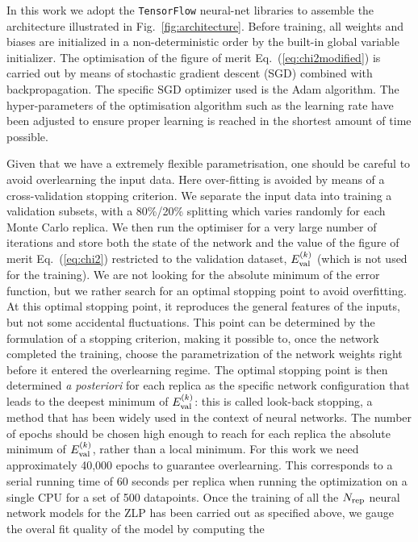 In this work we adopt the {\tt TensorFlow} neural-net libraries to assemble
the architecture illustrated in  Fig.~\ref{fig:architecture}.
%
Before training, all weights and biases are initialized in a non-deterministic order
by the built-in global variable initializer. 
%
The optimisation of the figure of merit Eq.~(\ref{eq:chi2modified}) is carried
out by means of stochastic gradient descent (SGD) combined with backpropagation. The
specific SGD optimizer used is the Adam algorithm.
%
The hyper-parameters of the optimisation algorithm such as the learning rate
have been adjusted to ensure proper learning is reached in the shortest amount
of time possible.
%

Given that we have a extremely flexible parametrisation, one should be careful
to avoid overlearning the input data.
%
Here over-fitting is avoided by means of a cross-validation stopping criterion.
%
We separate the input data into training a validation subsets, with a 80\%/20\% splitting
which varies randomly for each Monte Carlo replica.
%
We then run the optimiser for a very large number of iterations and store both
the state of the network and the value
of the figure of merit Eq.~(\ref{eq:chi2}) restricted to the validation
dataset, $E^{(k)}_{\rm val}$ (which is not used for the training).
%
We are not looking for the absolute minimum of the error function, 
but we rather search for an optimal stopping point to avoid overfitting. 
%
At this optimal stopping point, it reproduces the general features of the inputs, 
but not some accidental fluctuations. 
%
This point can be determined by the formulation of a stopping criterion, 
making it possible to, once the network completed the training, 
choose the parametrization of the network weights right before it 
entered the overlearning regime. 
%
The optimal stopping point is then determined {\it a posteriori} for each replica
as the specific network configuration that leads to the deepest minimum of $E^{(k)}_{\rm val}$:
this is called look-back stopping, a method that has been widely used in the context
of neural networks.
%
The number of epochs should be chosen high enough to reach for each replica 
the absolute minimum of $E^{(k)}_{\rm val}$, 
rather than a local minimum.
For this work we need approximately 40,000 epochs to guarantee overlearning.
%
This corresponds to a serial running time of 60 seconds per replica when running the optimization on a 
single CPU for a set of 500 datapoints.
%
Once the training of all the $N_{\rm rep}$ neural network models for the ZLP has been carried
out as specified above, we gauge the overal fit quality of the model by computing the
